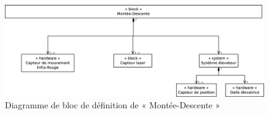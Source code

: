 \begin{figure}[H]
	\centering
	\includegraphics[width=1\linewidth]{diagrams/bathroom/diagramme_blocks_bdd2.eps}
	\caption{Diagramme de bloc de définition de « Montée-Descente »}
	\label{fig:diagramme_bdd2}
\end{figure}
